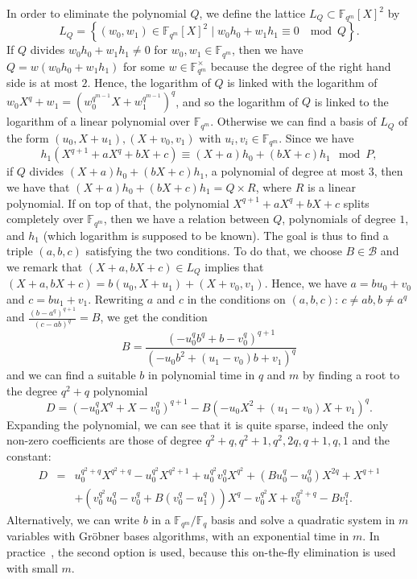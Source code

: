 \documentclass[a4paper,11pt]{article}
\theoremstyle{break}
\theoremstyle{sc}
\theoremstyle{definition}
\theoremstyle{remark}
\begin{document}
In order to eliminate the polynomial $Q$, we define the lattice $L_Q\subset
\mathbb{F}_{q^m}[X]^2$ by 
\[
  L_Q = \left\{ (w_0,
    w_1)\in\mathbb{F}_{q^m}[X]^2\;|\;w_0h_0+w_1h_1\equiv0\;\mod Q \right\}.
\]
If $Q$ divides $w_0h_0+w_1h_1\neq0$ for $w_0, w_1\in \mathbb{F}_{q^m}$, then we have
$Q = w(w_0h_0+w_1h_1)$ for some $w\in\mathbb{F}_{q^m}^\times$ because the degree
of the right hand side is at most $2$. Hence, the logarithm of $Q$ is linked
with the logarithm of $w_0X^q+w_1=(w_0^{q^{m-1}}X+w_1^{q^{m-1}})^q$, and so the
logarithm of $Q$ is linked to the logarithm of a linear
polynomial over $\mathbb{F}_{q^m}$. Otherwise we can find a basis of $L_Q$
of the form $(u_0, X+u_1), (X+v_0, v_1)$ with $u_i, v_i\in\mathbb{F}_{q^m}$.
Since we have
\[
  h_1(X^{q+1}+aX^q+bX+c)\equiv(X+a)h_0+(bX+c)h_1\mod P,
\]
if $Q$ divides $(X+a)h_0+(bX+c)h_1$, a polynomial of degree at most $3$, then we
have that $(X+a)h_0+(bX+c)h_1=Q\times R$, where $R$ is a linear polynomial. If
on top of that, the polynomial $X^{q+1}+aX^q+bX+c$ splits completely over
$\mathbb{F}_{q^m}$, then we have a relation between $Q$, polynomials of degree
$1$, and $h_1$ (which logarithm is supposed to be known). The goal is thus to
find a triple $(a, b, c)$ satisfying the two conditions. To do that, we choose
$B\in \mathcal B$ and we remark that $(X+a,
bX+c)\in L_Q$ implies that $(X+a, bX+c)=b(u_0, X+u_1)+(X+v_0, v_1)$. Hence, we
have $a=bu_0+v_0$ and $c=bu_1+v_1$. Rewriting $a$ and $c$ in the conditions
on $(a,b,c)$: $c\neq ab,b\neq a^q$ and $\frac{(b-a^q)^{q+1}}{(c-ab)^q}=B$, we
get the condition
\[
  B = \frac{(-u_0^qb^q+b-v_0^q)^{q+1}}{(-u_0b^2+(u_1-v_0)b+v_1)^q}
\]
and we can find a suitable $b$ in polynomial time in $q$ and $m$ by finding a
root to the degree
$q^2+q$ polynomial
\[
  D = (-u_0^qX^q+X-v_0^q)^{q+1} - B(-u_0X^2+(u_1-v_0)X+v_1)^q.
\]
Expanding the polynomial, we can see that it is quite sparse, indeed the only
non-zero coefficients are those of degree $q^2+q, q^2+1, q^2, 2q, q+1, q, 1$ and
the constant:
\begin{eqnarray*}
  D &=&
  u_0^{q^2+q}X^{q^2+q}-u_0^{q^2}X^{q^2+1}+u_0^{q^2}v_0^qX^{q^2}+(Bu_0^q-u_0^q)X^{2q}+X^{q+1} \\
  & & +(v_0^{q^2}u_0^q-v_0^q+B(v_0^q-u_1^q))X^q-v_0^{q^2}X+v_0^{q^2+q}-Bv_1^q.
\end{eqnarray*}
Alternatively, we can write $b$ in a $\mathbb{F}_{q^m}/\mathbb{F}_q$
basis and solve a quadratic system in $m$ variables with Gröbner bases
algorithms, with an exponential time in $m$. In practice~\cite{Adj16}, the
second option is used, because this on-the-fly elimination is used with small $m$.
\end{document}
